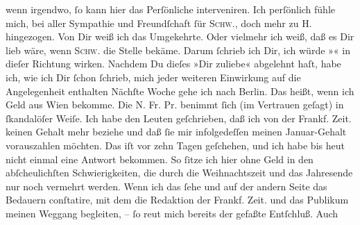 \begin{ledgroupsized}[t]{13cm}
               wenn irgendwo, ſo \strikeout{\textcolor{gray}{×}\textcolor{gray}{i}\textcolor{gray}{×}} kann hier das Perſönliche interveniren. Ich perſönlich fühle mich, bei aller
               Sympathie und Freundſchaft ſür \textsc{Schw}., doch mehr zu \textsc{H}. hingezogen. Von Dir weiß ich das Umgekehrte.
               Oder vielmehr ich weiß, daß es Dir lieb wäre, wenn \textsc{Schw}. die Stelle bekäme. Darum ſchrieb ich Dir, ich würde »\label{K_L02900-7v}\label{K_L02900-7h}« in dieſer Richtung wirken. Nachdem Du dieſes »Dir zuliebe« abgelehnt haſt,
               habe ich, wie ich Dir ſchon ſchrieb, \strikeout{\textcolor{gray}{×}\-\textcolor{gray}{×}\-\textcolor{gray}{×}} mich jeder weiteren Einwirkung auf die Angelegenheit enthalten{\dotsfour}\pend
           \pstart
           Nächſte Woche gehe ich nach Berlin. Das heißt,
               wenn ich Geld aus Wien bekomme. Die N. Fr. Pr. benimmt ſich {\pb}(im
               Vertrauen geſagt) in ſkandalöſer Weiſe. Ich habe den Leuten geſchrieben, daß ich von der Frankf. Zeit. keinen Gehalt mehr beziehe und daß ſie mir
               infolgedeſſen meinen Januar-Gehalt vorauszahlen möchten.
               Das iſt vor zehn Tagen geſchehen, und ich habe bis heut nicht einmal eine Antwort bekommen. So ſitze ich hier ohne Geld in
               den abſcheulichſten Schwierigkeiten, die durch die Weihnachtszeit und das Jahresende
               nur noch vermehrt werden. Wenn ich das ſehe und auf der andern Seite das Bedauern
               conſtatire, mit dem die Redaktion der Frankf. Zeit. und das
               Publikum meinen Weggang begleiten, – ſo reut mich bereits der gefaßte Entſchluß. Auch

\end{ledgroupsized}
